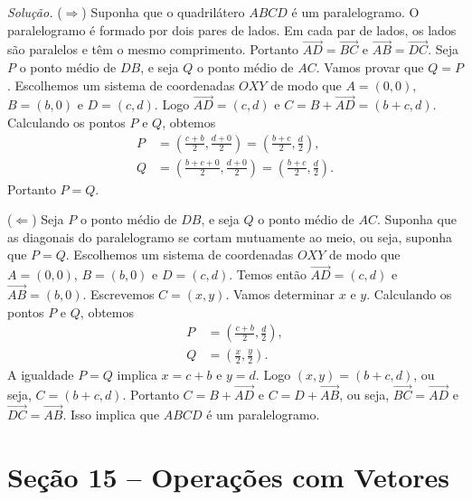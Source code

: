 \documentclass[a4paper,11pt]{article}
\begin{document}
\vspace{\baselineskip}

\emph{Solução.}
($\Rightarrow$)
Suponha que o quadrilátero $ABCD$ é um paralelogramo.
O paralelogramo é formado por dois pares de lados.
Em cada par de lados, os lados são paralelos e têm o mesmo comprimento.
Portanto $\overrightarrow{AD} = \overrightarrow{BC}$ e $\overrightarrow{AB} = \overrightarrow{DC}$.
Seja $P$ o ponto médio de $DB$, e seja $Q$ o ponto médio de $AC$.
Vamos provar que $Q = P$.
Escolhemos um sistema de coordenadas $OXY$ de modo que $A = (0,0)$, $B = (b,0)$ e $D = (c, d)$.
Logo $\overrightarrow{AD} = (c,d)$ e $C = B + \overrightarrow{AD} = (b + c, d)$.
Calculando os pontos $P$ e $Q$, obtemos
\begin{align*}
  P & = \left( \frac{c+b}{2}, \frac{d+0}{2} \right) = \left( \frac{b+c}{2}, \frac{d}{2} \right), \\
  Q & = \left( \frac{b + c + 0}{2}, \frac{d+0}{2} \right) = \left( \frac{b+c}{2}, \frac{d}{2} \right).
\end{align*}
Portanto $P = Q$.

($\Leftarrow$)
Seja $P$ o ponto médio de $DB$, e seja $Q$ o ponto médio de $AC$.
Suponha que as diagonais do paralelogramo se cortam mutuamente ao meio, ou seja, suponha que $P = Q$.
Escolhemos um sistema de coordenadas $OXY$ de modo que $A = (0,0)$, $B = (b,0)$ e $D = (c, d)$.
Temos então $\overrightarrow{AD} = (c,d)$ e $\overrightarrow{AB} = (b,0)$.
Escrevemos $C = (x,y)$.
Vamos determinar $x$ e $y$.
Calculando os pontos $P$ e $Q$, obtemos
\begin{align*}
  P & = \left( \frac{c+b}{2}, \frac{d}{2} \right), \\
  Q & = \left( \frac{x}{2}, \frac{y}{2} \right).
\end{align*}
A igualdade $P = Q$ implica $x = c + b$ e $y = d$.
Logo $(x,y) = (b + c, d)$, ou seja, $C = (b + c, d)$.
Portanto $C = B + \overrightarrow{AD}$ e $C = D + \overrightarrow{AB}$, ou seja, $\overrightarrow{BC} = \overrightarrow{AD}$ e $\overrightarrow{DC} = \overrightarrow{AB}$.
Isso implica que $ABCD$ é um paralelogramo.

\section*{Seção 15 -- Operações com Vetores}
\end{document}
